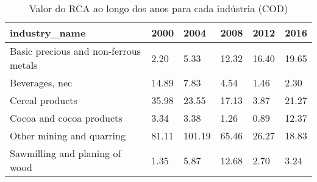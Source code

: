 \begin{table}
\centering
\caption{Valor do RCA ao longo dos anos para cada indústria (COD)}
\begin{tabular}{p{6cm}p{1.5cm}p{1.5cm}p{1.5cm}p{1.5cm}p{1.5cm}}
\toprule
                        industry\_name &  2000 &   2004 &  2008 &  2012 &  2016 \\
\midrule
Basic precious and non-ferrous metals &  2.20 &   5.33 & 12.32 & 16.40 & 19.65 \\
                       Beverages, nec & 14.89 &   7.83 &  4.54 &  1.46 &  2.30 \\
                      Cereal products & 35.98 &  23.55 & 17.13 &  3.87 & 21.27 \\
             Cocoa and cocoa products &  3.34 &   3.38 &  1.26 &  0.89 & 12.37 \\
            Other mining and quarring & 81.11 & 101.19 & 65.46 & 26.27 & 18.83 \\
       Sawmilling and planing of wood &  1.35 &   5.87 & 12.68 &  2.70 &  3.24 \\
\bottomrule
\end{tabular}
\end{table}
